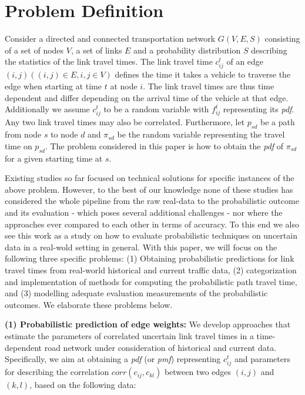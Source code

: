 \section{Problem Definition}
\label{sec:problemdef}
Consider a directed and connected transportation network $G(V, E, S)$
consisting of a set of nodes $V$, a set of links $E$ and a probability
distribution $S$ describing the statistics of the link travel times. The
link travel time $c_{ij}^t$ of an edge  $(i,j) ((i,j) \in E, i, j \in V)$ defines the time
it takes a vehicle to traverse the edge when starting at time $t$ at node
$i$. The link travel times are thus time dependent and differ depending on the
arrival time of the vehicle at that edge. Additionally we assume $c_{ij}^t$ to
be a random variable with $f_{ij}^t$ representing its \textit{pdf}. Any two link travel
times may also be correlated. Furthermore, let $p_{sd}$ be a path from node $s$
to node $d$ and $\pi_{sd}$ be the random variable representing the travel time
on $p_{sd}$. The problem considered in this paper is how to obtain the
\textit{pdf} of $\pi_{sd}$ for a given starting time at $s$.

Existing studies so far focused on technical solutions for specific instances of
the above problem. However, to the best of our knowledge none of these studies
has considered the whole pipeline from the raw real-data to the probabilistic
outcome and its evaluation - which poses several additional challenges - nor
where the approaches ever compared to each other in terms of accuracy. To
this end we also see this work as a study on how to evaluate
probabilistic techniques on uncertain data in a real-wold setting in general.
With this paper, we will focus on the following three specific problems: (1)
Obtaining probabilistic predictions for link travel times from real-world
historical and current traffic data, (2) categorization and implementation of
methods for computing the probabilistic path travel time, and (3) modelling adequate
evaluation measurements of the probabilistic outcomes. We elaborate these
problems below.

\textbf{(1) Probabilistic prediction of edge weights:} We
develop approaches that estimate the parameters of correlated uncertain link travel times in a time-dependent road
network under consideration of historical and current data. Specifically, we aim
at obtaining a \textit{pdf} (or \textit{pmf}) representing $c_{ij}^t$ and parameters for
describing the correlation $corr(c_{ij},c_{kl})$ between two edges $(i,j)$ and
$(k,l)$, based on the following data:

